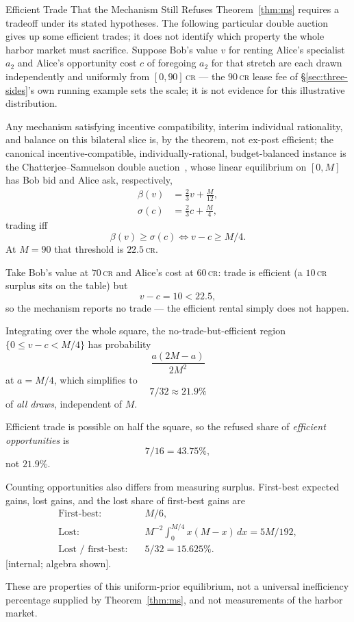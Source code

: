 \documentclass[11pt,a4paper]{article}
\theoremstyle{definition}
\theoremstyle{definition}
\theoremstyle{remark}
\begin{document}
\begin{pdexample}{Efficient Trade That the Mechanism Still Refuses}
\setlength{\parskip}{4pt plus 1pt}
Theorem~\ref{thm:ms} requires a tradeoff under its stated hypotheses.
The following particular double auction gives up some efficient trades; it
does not identify which property the whole harbor market must sacrifice. Suppose Bob's value $v$ for renting
Alice's specialist $a_2$ and Alice's opportunity cost $c$ of foregoing $a_2$ for
that stretch are each drawn independently and uniformly from $[0,90]$\,\textsc{cr}
--- the $90$\,\textsc{cr} lease fee of \S\ref{sec:three-sides}'s own running
example sets the scale; it is not evidence for this illustrative distribution.

Any mechanism satisfying
incentive compatibility, interim individual rationality, and balance on this
bilateral slice is, by the
theorem, not ex-post efficient; the canonical incentive-compatible,
individually-rational, budget-balanced instance is the
Chatterjee--Samuelson double auction~, whose \mbox{linear}
equilibrium on $[0,M]$ has Bob bid and Alice ask, respectively,
\[
\begin{aligned}
\beta(v)&=\tfrac{2}{3}v+\tfrac{M}{12},\\
\sigma(c)&=\tfrac{2}{3}c+\tfrac{M}{4},
\end{aligned}
\]
trading iff
\[
\beta(v)\ge\sigma(c) \iff v-c\ge M/4.
\]
At $M=90$ that threshold is $22.5$\,\textsc{cr}.

Take Bob's value
at $70$\,\textsc{cr} and Alice's cost at $60$\,\textsc{cr}: trade is efficient
(a $10$\,\textsc{cr} surplus sits on the table) but
\[
v-c=10<22.5,
\]
so the mechanism reports no trade --- the efficient rental simply does not happen.

Integrating over the whole square, the no-trade-but-efficient region
$\{0\le v-c<M/4\}$ has probability
\[
\dfrac{a(2M-a)}{2M^2}
\]
at $a=M/4$, which simplifies to
\[
7/32\approx21.9\%
\]
of \emph{all draws}, independent of $M$.

Efficient trade is possible on half the square, so the refused share of
\emph{efficient opportunities} is
\[
7/16=43.75\%,
\]
not $21.9\%$.

Counting opportunities also differs from measuring surplus. First-best
expected gains, lost gains, and the lost share of first-best gains are
\[
\begin{aligned}
\text{First-best:}\quad &M/6,\\
\text{Lost:}\quad &M^{-2}\int_0^{M/4}x(M-x)\,dx=5M/192,\\
\text{Lost / first-best:}\quad &5/32=15.625\%.
\end{aligned}
\]
[internal; algebra shown].

These are properties of this uniform-prior
equilibrium, not a universal inefficiency percentage supplied by
Theorem~\ref{thm:ms}, and not measurements of the harbor market.
\end{pdexample}
\end{document}
